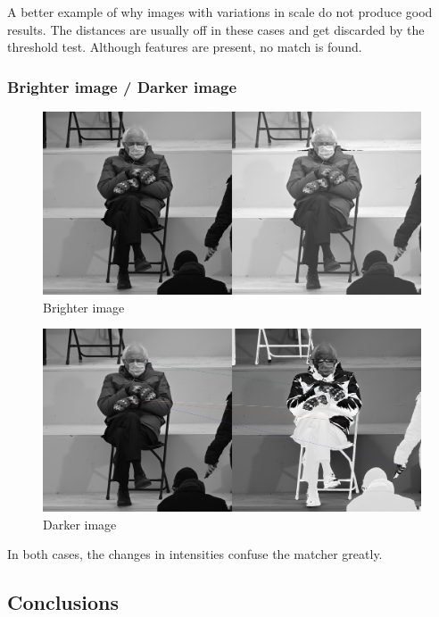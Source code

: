 \documentclass[12pt,a4paper]{report}
\begin{document}
A better example of why images with variations in scale do not produce good results. The distances are usually off in these cases and get discarded by the threshold test. Although features are present, no match is found.

\clearpage
\subsubsection*{Brighter image / Darker image}

\begin{figure}[ht]
	\centering
	\includegraphics[width=\textwidth]{brighterBernie.jpg_match}
	\caption{Brighter image}
\end{figure}

\begin{figure}[ht]
	\centering
	\includegraphics[width=\textwidth]{darkerBernie.jpg_match}
	\caption{Darker image}
\end{figure}

In both cases, the changes in intensities confuse the matcher greatly.

\clearpage
\subsection*{Conclusions}
\end{document}
